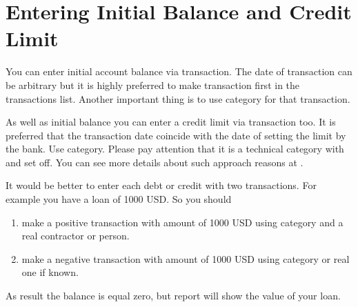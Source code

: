 \documentclass[a4paper,10pt,english]{sphinxmanual}
\begin{document}
\section{Entering Initial Balance and Credit Limit}
\label{\detokenize{getting-started:entering-initial-balance-and-credit-limit}}
\sphinxAtStartPar
You can enter initial account balance via transaction. The date of transaction can be arbitrary but it is
highly preferred to make transaction first in the transactions list.
Another important thing is to use category  for that transaction.

\noindent{}
\noindent{}

\sphinxAtStartPar
As well as initial balance you can enter a credit limit via transaction too. It is preferred that the transaction date coincide with the date of setting the limit by the bank.
Use  category. Please pay attention that it is a technical category with
 and  set off. You can see more details about such approach reasons
at .

\noindent{}
\noindent{}

\sphinxAtStartPar
It would be better to enter each debt or credit with two transactions. For example you have a loan of 1000 USD. So you should
\begin{enumerate}
%
\item {} 
\sphinxAtStartPar
make a positive transaction with amount of 1000 USD using category  and a real contractor or person.

\item {} 
\sphinxAtStartPar
make a negative transaction with amount of 1000 USD using category  or real one if known.

\end{enumerate}

\sphinxAtStartPar
As result the balance is equal zero, but  report will show the value of your loan.
\end{document}
